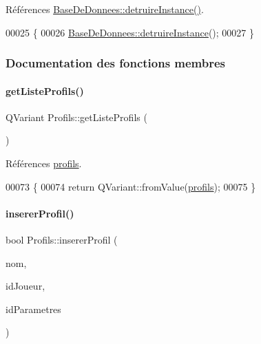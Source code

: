 Références \hyperlink{class_base_de_donnees_a457401c0816b888c77ce915997545f4e}{Base\+De\+Donnees\+::detruire\+Instance()}.


\begin{DoxyCode}
00025 \{
00026     \hyperlink{class_base_de_donnees_a457401c0816b888c77ce915997545f4e}{BaseDeDonnees::detruireInstance}();
00027 \}
\end{DoxyCode}


\subsubsection{Documentation des fonctions membres}
\mbox{\label{class_profils_aca3d2255478f977eaa84ffa3eea920b1}} 
\paragraph{\texorpdfstring{get\+Liste\+Profils()}{getListeProfils()}}
{\footnotesize\ttfamily Q\+Variant Profils\+::get\+Liste\+Profils (\begin{DoxyParamCaption}{ }\end{DoxyParamCaption})}



Références \hyperlink{class_profils_ae5de1fe3b6121bec80e3def390b5df15}{profils}.


\begin{DoxyCode}
00073 \{
00074     \textcolor{keywordflow}{return} QVariant::fromValue(\hyperlink{class_profils_ae5de1fe3b6121bec80e3def390b5df15}{profils});
00075 \}
\end{DoxyCode}
\mbox{\label{class_profils_ae560041d0af81c5b77a8448d78122d04}} 
\paragraph{\texorpdfstring{inserer\+Profil()}{insererProfil()}}
{\footnotesize\ttfamily bool Profils\+::inserer\+Profil (\begin{DoxyParamCaption}\item[{Q\+String}]{nom,  }\item[{Q\+String}]{id\+Joueur,  }\item[{Q\+String}]{id\+Parametres }\end{DoxyParamCaption})}



